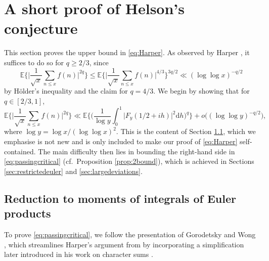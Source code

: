 \documentclass{amsart}
\theoremstyle{definition}
\theoremstyle{remark}
\numberwithin{equation}{section}
\begin{document}
\section{A short proof of Helson's conjecture}\label{sec:Helson}
This section proves the upper bound in \eqref{eq:Harper}. As observed by Harper \cite{HarperRMF}, it suffices to do so for $q\geq 2/3$, since
\begin{equation}\label{eq:holderlift}
    \mathbb{E}\bigg\{\Big|\frac{1}{\sqrt{x}}\sum_{n\leq x} f(n)\Big|^{2q}\bigg\} \leq \mathbb{E}\bigg\{\Big|\frac{1}{\sqrt{x}}\sum_{n\leq x}f(n)\Big|^{4/3}\bigg\}^{3q/2} \ll ({\log\log x})^{-q/2}
\end{equation}
by Hölder's inequality and the claim for $q=4/3$. We begin by showing that for $q\in [2/3,1]$,
\begin{equation}\label{eq:passingcritical}
    \mathbb{E}\bigg\{\Big|\frac{1}{\sqrt{x}}\sum_{n\leq x}f(n)\bigg|^{2q}\Big\} \ll \mathbb{E}\bigg\{\bigg(\frac{1}{\log y}\int_0^1 \big|F_y(1/2+ih)\big|^2\mathrm{d}h\bigg)^q\bigg\}+o\big((\log\log y)^{-q/2}),
\end{equation}
where $\log y=\log x/(\log\log x)^2$. This is the content of Section \ref{sec:passing}, which we emphasise is not new and is only included to make our proof of \eqref{eq:Harper} self-contained. The main difficulty then lies in bounding the right-hand side in \eqref{eq:passingcritical} (cf.\ Proposition \ref{prop:2bound}), which is achieved in Sections \ref{sec:restrictedeuler} and \ref{sec:largedeviations}.

\subsection{Reduction to moments of integrals of Euler products}\label{sec:passing} To prove \eqref{eq:passingcritical}, we follow the presentation of Gorodetsky and Wong \cite{GWHelson}, which streamlines Harper’s argument from \cite{HarperRMF} by incorporating a simplification later introduced in his work on character sums \cite[p.~13]{HarperDeterministic}.
\end{document}

